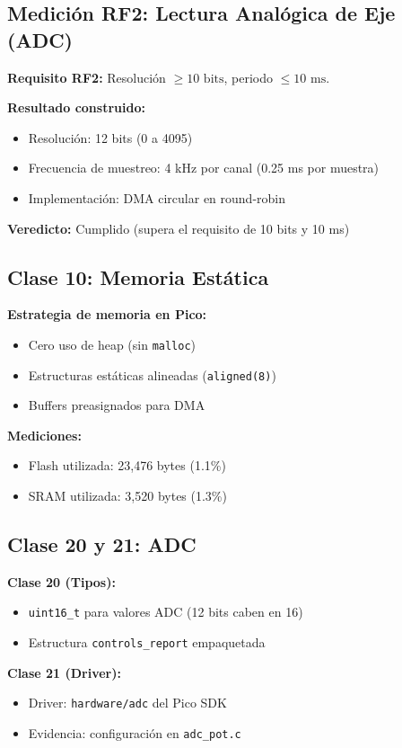 
\subsection{Medición RF2: Lectura Analógica de Eje (ADC)}

\textbf{Requisito RF2:} Resolución $\ge 10\text{ bits}$, periodo $\le 10\text{ ms}$.

\textbf{Resultado construido:}
\begin{itemize}
	\item Resolución: 12 bits (0 a 4095)
	\item Frecuencia de muestreo: 4 kHz por canal (0.25 ms por muestra)
	\item Implementación: DMA circular en round-robin
\end{itemize}

\textbf{Veredicto:} Cumplido (supera el requisito de 10 bits y 10 ms)

\subsection{Clase 10: Memoria Estática}

\textbf{Estrategia de memoria en Pico:}
\begin{itemize}
	\item Cero uso de heap (sin \texttt{malloc})
	\item Estructuras estáticas alineadas (\texttt{aligned(8)})
	\item Buffers preasignados para DMA
\end{itemize}

\textbf{Mediciones:}
\begin{itemize}
	\item Flash utilizada: 23,476 bytes (1.1\%)
	\item SRAM utilizada: 3,520 bytes (1.3\%)
\end{itemize}

\subsection{Clase 20 y 21: ADC}

\textbf{Clase 20 (Tipos):}
\begin{itemize}
	\item \texttt{uint16\_t} para valores ADC (12 bits caben en 16)
	\item Estructura \texttt{controls\_report} empaquetada
\end{itemize}

\textbf{Clase 21 (Driver):}
\begin{itemize}
	\item Driver: \texttt{hardware/adc} del Pico SDK
	\item Evidencia: configuración en \texttt{adc\_pot.c}
\end{itemize}
